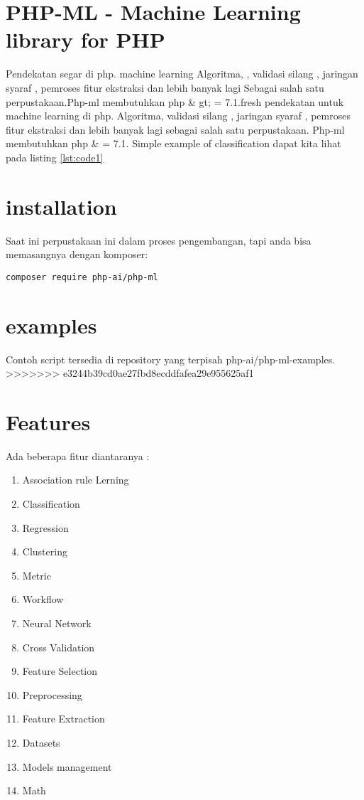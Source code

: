 
\section{PHP-ML - Machine Learning library for PHP}
Pendekatan segar di php. machine learning Algoritma, , validasi silang , jaringan syaraf , pemroses fitur ekstraksi dan lebih banyak lagi Sebagai salah satu perpustakaan.Php-ml membutuhkan php \& gt; = 7.1.fresh pendekatan untuk machine learning di php. Algoritma, validasi silang , jaringan syaraf , pemroses fitur ekstraksi dan lebih banyak lagi sebagai salah satu perpustakaan.
Php-ml membutuhkan php \& = 7.1.
Simple example of classification dapat kita lihat pada listing \ref{lst:code1}

\section{installation} 
Saat ini perpustakaan ini dalam proses pengembangan, tapi anda bisa memasangnya dengan komposer:

\begin{verbatim}composer require php-ai/php-ml\end{verbatim}

\section{examples}
Contoh script tersedia di repository yang terpisah php-ai/php-ml-examples.
>>>>>>> e3244b39cd0ae27fbd8ecddfafea29e955625af1

\section{Features}
Ada beberapa fitur diantaranya :
\begin{enumerate}
\item Association rule Lerning
\item Classification
\item Regression
\item Clustering
\item Metric
\item Workflow
\item Neural Network
\item Cross Validation
\item Feature Selection
\item Preprocessing
\item Feature Extraction
\item Datasets
\item Models management
\item Math
\end{enumerate}

